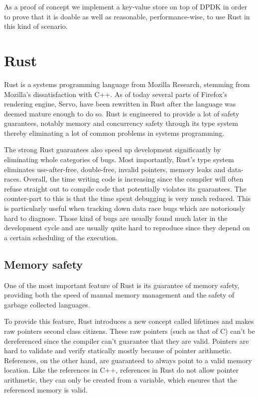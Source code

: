 \documentclass[11pt]{article}
\begin{document}
As a proof of concept we implement a key-value store on top of
DPDK in order to prove that it is doable as well as reasonable,
performance-wise, to use Rust in this kind of scenario.

\section{Rust}

Rust is a systems programming language from Mozilla Research, stemming
from Mozilla's dissatisfaction with C++. As of today several parts of
Firefox's rendering engine, Servo, have been rewritten in Rust after
the language was deemed mature enough to do so. Rust is engineered to
provide a lot of safety guarantees, notably memory and concurrency
safety through its type system thereby eliminating a lot of common
problems in systems programming.

The strong Rust guarantees also speed up development significantly by
eliminating whole categories of bugs. Most importantly, Rust's type system
eliminates use-after-free, double-free, invalid pointers, memory leaks
and data-races. Overall, the time writing code is increasing since the
compiler will often refuse straight out to compile code that
potentially violates its guarantees. The counter-part to this is that
the time spent debugging is very much reduced. This is particularly
useful when tracking down data race bugs which are notoriously hard to
diagnose. Those kind of bugs are usually found much later in the
development cycle and are usually quite hard to reproduce since they
depend on a certain scheduling of the execution.

\subsection{Memory safety}

One of the most important feature of Rust is its guarantee of memory
safety, providing both the speed of manual memory management and the
safety of garbage collected languages.

To provide this feature, Rust introduces a new concept called
lifetimes and makes raw pointers second class citizens. These raw
pointers (such as that of C) can't be dereferenced since the compiler
can't guarantee that they are valid. Pointers are hard to validate and
verify statically mostly because of pointer arithmetic. References, on
the other hand, are guaranteed to always point to a valid memory
location. Like the references in C++, references in Rust do not allow
pointer arithmetic, they can only be created from a variable, which
ensures that the referenced memory is valid.
\end{document}

